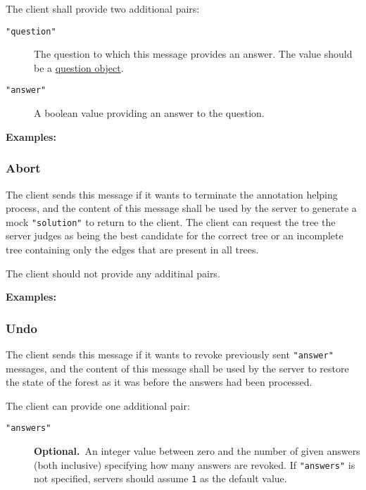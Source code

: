 \documentclass{scrartcl}
\newcommand{\jsstring}[1]{\texttt{\color{OrangeRed}"#1"}}
\newcommand{\js}[1]{\lstinline[style=JSONInputStyle];#1;}
\newcommand{\optional}{\textbf{Optional.}}
\newcommand{\Examples}{\noindent\textbf{Examples:}}
\begin{document}
The client shall provide two additional pairs:
\begin{description}
    \item[\jsstring{question}] The question to which this message provides an answer.
        The value should be a \hyperref[ssub:Question object]{question object}.
    \item[\jsstring{answer}] A boolean value providing an answer to the question.
\end{description}

\Examples



\subsubsection{Abort}
\label{ssub:Abort}

The client sends this message if it wants to terminate the annotation helping process,
and the content of this message shall be used by the server to generate a mock \jsstring{solution} to return to the client.
The client can request the tree the server judges as being the best candidate for the correct tree or an incomplete tree containing only the edges that are present in all trees.

The client should not provide any additinal pairs.

\Examples



\subsubsection{Undo}
\label{ssub:Undo}

The client sends this message if it wants to revoke previously sent \jsstring{answer} messages,
and the content of this message shall be used by the server to restore the state of the forest as it was before the answers had been processed.

The client can provide one additional pair:
\begin{description}
    \item[\jsstring{answers}] \optional\ An integer value between zero and the number of given answers (both inclusive) specifying how many answers are revoked.
        If \jsstring{answers} is not specified, servers should assume \js{1} as the default value.
\end{description}
\end{document}
